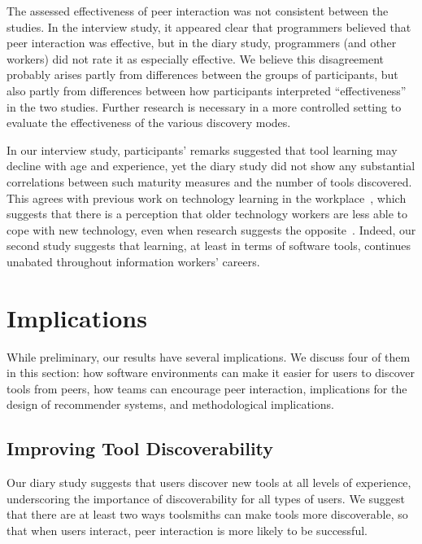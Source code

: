 \documentclass[smallextended]{svjour3}
\newcommand\discovery{peer interaction\xspace}
\begin{document}
The assessed effectiveness of \discovery was not consistent between the studies.
In the interview study, it appeared clear that programmers believed that
\discovery was effective, but in the diary study, 
programmers (and other workers) did not rate it as especially effective. 
We believe this disagreement probably arises partly from differences
between the groups of participants, but also partly from differences between
how participants interpreted ``effectiveness'' in the two studies.
Further research is necessary in a more controlled setting to evaluate
the effectiveness of the various discovery modes.

In our interview study, participants' remarks suggested that tool learning may decline with
age and experience, yet the diary study did not show any substantial 
correlations between such maturity measures and the number of tools discovered.
This agrees with previous work on technology learning in the workplace~\cite{brooke},
which suggests that there is a perception that older technology workers
are less able to cope with new technology, even when research suggests
the opposite~\cite{morrison}.
Indeed, our second study suggests that learning, at least in terms of software tools,
continues unabated throughout information workers' careers.

\section{Implications}\label{sec:discussion}

\noindent
While preliminary, our results have several implications.
We discuss four of them in this section: how software
environments can make it easier for users to discover tools from peers,
how teams can encourage \discovery,
implications for the design of recommender systems,
and methodological implications.

\subsection{Improving Tool Discoverability}\label{sec:discoverability}

\noindent
Our diary study suggests that users discover new tools 
at all levels of experience, underscoring the importance of
discoverability for all types of users.
We suggest that there are at least two ways toolsmiths can make
tools more discoverable, so that when users interact, \discovery is 
more likely to be successful.
\end{document}
